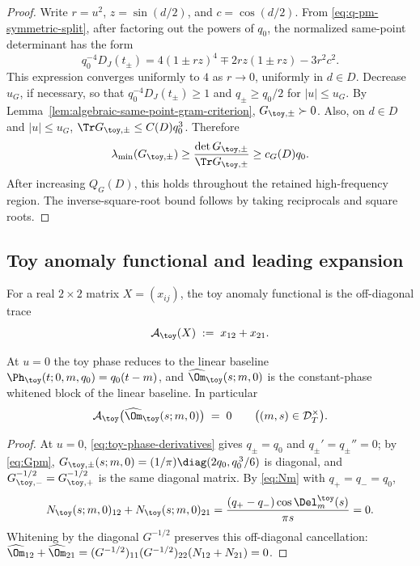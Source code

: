 \begin{proof}
Write \(r=u^2\), \(z=\sin(d/2)\), and \(c=\cos(d/2)\).  From
\eqref{eq:q-pm-symmetric-split}, after factoring out the powers of
\(q_0\), the normalized same-point determinant has the form
\[
q_0^{-4}D_J(t_\pm)
=
4(1\pm rz)^4 \mp 2rz(1\pm rz)-3r^2c^2.
\]
This expression converges uniformly to \(4\) as \(r\to0\), uniformly in
\(d\in D\).  Decrease \(u_G\), if necessary, so that
\(q_0^{-4}D_J(t_\pm)\ge 1\) and \(q_\pm\ge q_0/2\) for
\(|u|\le u_G\).  By Lemma~\ref{lem:algebraic-same-point-gram-criterion},
\(G_{\toy,\pm}\succ0\).  Also, on \(d\in D\) and \(|u|\le u_G\),
\(\Tr G_{\toy,\pm}\le C(D)q_0^3\).  Therefore
\[
\lambda_{\min}(G_{\toy,\pm})
\ge \frac{\det G_{\toy,\pm}}{\Tr G_{\toy,\pm}}
\ge c_G(D)q_0.
\]
After increasing \(Q_G(D)\), this holds throughout the retained
high-frequency region.  The inverse-square-root bound follows by taking
reciprocals and square roots.
\end{proof}

\subsection{Toy anomaly functional and leading expansion}
\label{subsec:toy-anomaly-functional}

\begin{definition}
\label{def:toy-anomaly-functional}
For a real \(2\times 2\) matrix \(X=(x_{ij})\), the toy anomaly
functional is the off-diagonal trace
\begin{equation}
\label{eq:toy-anomaly-functional}
\mathcal A_\toy(X)\;:=\;x_{12}+x_{21}.
\end{equation}
\end{definition}

\begin{lemma}
\label{lem:A-toy-baseline-vanishing}
At \(u=0\) the toy phase reduces to the linear baseline
\(\Ph_\toy(t;0,m,q_0)=q_0(t-m)\), and \(\widehat\Om_\toy(s;m,0)\) is
the constant-phase whitened block of the linear baseline.  In
particular
\begin{equation}
\label{eq:A-toy-baseline}
        \mathcal A_\toy\bigl(\widehat\Om_\toy(s;m,0)\bigr)\;=\;0
        \qquad\bigl((m,s)\in\mathcal D_T^\times\bigr).
\end{equation}
\end{lemma}

\begin{proof}
At \(u=0\), \eqref{eq:toy-phase-derivatives} gives \(q_\pm=q_0\) and
\(q_\pm'=q_\pm''=0\); by \eqref{eq:Gpm},
\(G_{\toy,\pm}(s;m,0)=(1/\pi)\diag(2q_0,q_0^{\,3}/6)\) is diagonal,
and \(G_{\toy,-}^{-1/2}=G_{\toy,+}^{-1/2}\) is the same diagonal
matrix.  By \eqref{eq:Nm} with \(q_+=q_-=q_0\),
\[
N_\toy(s;m,0)_{12}+N_\toy(s;m,0)_{21}
=\frac{(q_+-q_-)\cos\Del_m^\toy(s)}{\pi s}=0.
\]
Whitening by the diagonal \(G^{-1/2}\) preserves this off-diagonal
cancellation: \(\widehat\Om_{12}+\widehat\Om_{21}
=(G^{-1/2})_{11}(G^{-1/2})_{22}(N_{12}+N_{21})=0\).
\end{proof}

